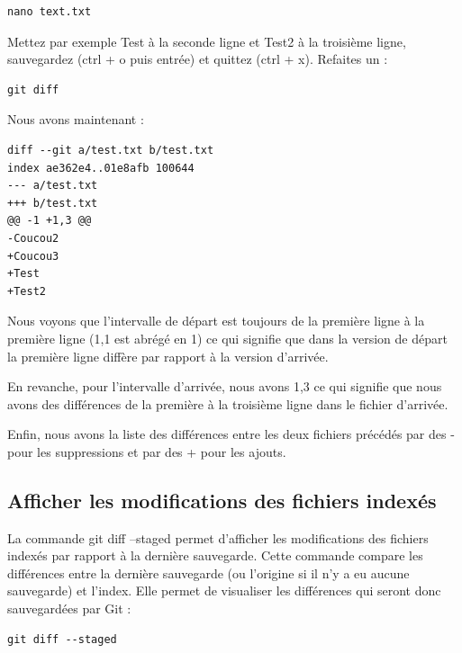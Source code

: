 \documentclass{article}
\begin{document}
\begin{verbatim}
nano text.txt
\end{verbatim}

Mettez par exemple {\color{blue}Test} à la seconde ligne et {\color{blue}Test2} à la troisième ligne, sauvegardez ({\color{blue}ctrl + o} puis entrée) et quittez ({\color{blue}ctrl + x}). Refaites un :

\begin{verbatim}
git diff
\end{verbatim}

Nous avons maintenant :

\begin{verbatim}
diff --git a/test.txt b/test.txt
index ae362e4..01e8afb 100644
--- a/test.txt
+++ b/test.txt
@@ -1 +1,3 @@
-Coucou2
+Coucou3
+Test
+Test2
\end{verbatim}

Nous voyons que l'intervalle de départ est toujours de la première ligne à la première ligne ({\color{blue}1,1} est abrégé en {\color{blue}1}) ce qui signifie que dans la version de départ la première ligne diffère par rapport à la version d'arrivée.

En revanche, pour l'intervalle d'arrivée, nous avons {\color{blue}1,3} ce qui signifie que nous avons des différences de la première à la troisième ligne dans le fichier d'arrivée.

Enfin, nous avons la liste des différences entre les deux fichiers précédés par des {\color{blue}-} pour les suppressions et par des {\color{blue}+} pour les ajouts.

\subsection{Afficher les modifications des fichiers indexés}
La commande {\color{blue}git diff --staged} permet d'afficher les modifications des fichiers indexés par rapport à la dernière sauvegarde. Cette commande compare les différences entre la dernière sauvegarde (ou l'origine si il n'y a eu aucune sauvegarde) et l'index. Elle permet de visualiser les différences qui seront donc sauvegardées par {\color{blue}Git} :

\begin{verbatim}
git diff --staged
\end{verbatim}
\end{document}
